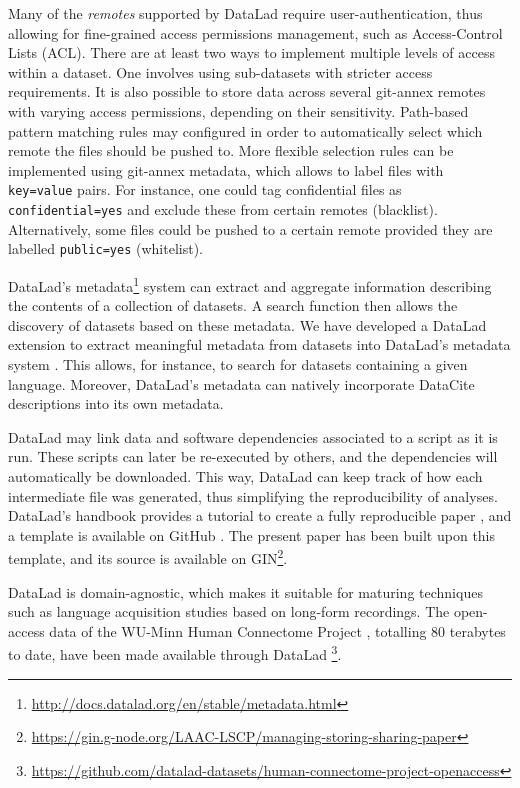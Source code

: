 \documentclass[smallextended]{svjour3}       %
\begin{document}
Many of the \emph{remotes} supported by DataLad require user-authentication, thus allowing for fine-grained access permissions management, such as Access-Control Lists (ACL). There are at least two ways to implement multiple levels of access within a dataset. One involves using sub-datasets with stricter access requirements. It is also possible to store data across several git-annex remotes with varying access permissions, depending on their sensitivity. Path-based pattern matching rules may configured in order to automatically select which remote the files should be pushed to. More flexible selection rules can be implemented using git-annex metadata, which allows to label files with \texttt{key=value} pairs. For instance, one could tag confidential files as \texttt{confidential=yes} and exclude these from certain remotes (blacklist). Alternatively, some files could be pushed to a certain remote provided they are labelled \texttt{public=yes} (whitelist).

DataLad's metadata\footnote{\url{http://docs.datalad.org/en/stable/metadata.html}} system can extract and aggregate information describing the contents of a collection of datasets. A search function then allows the discovery of datasets based on these metadata. We have developed a DataLad extension to extract meaningful metadata from datasets into DataLad's metadata system \citep{datalad_extension}. This allows, for instance, to search for datasets containing a given language. Moreover, DataLad's metadata can natively incorporate DataCite \citep{brase2009datacite} descriptions into its own metadata.

DataLad may link data and software dependencies associated to a script as it is run. These scripts can later be re-executed by others, and the dependencies will automatically be downloaded. This way, DataLad can keep track of how each intermediate file was generated, thus simplifying the reproducibility of analyses. DataLad's handbook provides a tutorial to create a fully reproducible paper \citep[Chapter~22]{datalad_handbook}, and a template is available on GitHub \citep{reproducible_paper}. The present paper has been built upon this template, and its source is available on GIN\footnote{\url{https://gin.g-node.org/LAAC-LSCP/managing-storing-sharing-paper}}.

DataLad is domain-agnostic, which makes it suitable for maturing techniques such as language acquisition studies based on long-form recordings. The open-access data of the WU-Minn Human Connectome Project \citep{pub.1022076283}, totalling 80 terabytes to date, have been made available through DataLad \footnote{\label{note:hcp}\url{https://github.com/datalad-datasets/human-connectome-project-openaccess}}.
\end{document}
